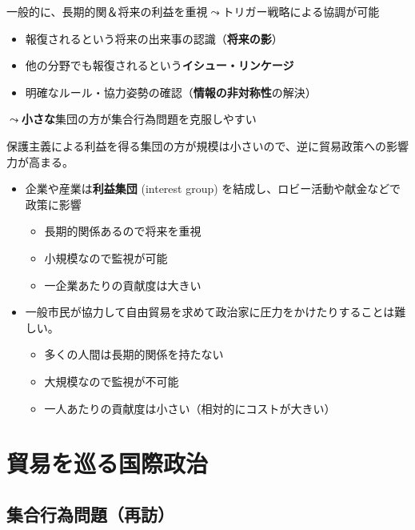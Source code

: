 \documentclass[
  xelatex,
  ja=standard]{bxjsarticle}
\providecommand{\tightlist}{%
  \setlength{\itemsep}{0pt}\setlength{\parskip}{0pt}}\usepackage{longtable,booktabs,array}
\begin{document}
一般的に、長期的関＆将来の利益を重視\(\leadsto\)トリガー戦略による協調が可能

\begin{itemize}
\tightlist
\item
  報復されるという将来の出来事の認識（\textbf{将来の影}）
\item
  他の分野でも報復されるという\textbf{イシュー・リンケージ}
\item
  明確なルール・協力姿勢の確認（\textbf{情報の非対称性}の解決）
\end{itemize}

\(\leadsto\)\textbf{小さな}集団の方が集合行為問題を克服しやすい\citep{olson1996}

保護主義による利益を得る集団の方が規模は小さいので、逆に貿易政策への影響力が高まる。

\begin{itemize}
\tightlist
\item
  企業や産業は\textbf{利益集団} (interest group)
  を結成し、ロビー活動や献金などで政策に影響

  \begin{itemize}
  \tightlist
  \item
    長期的関係あるので将来を重視
  \item
    小規模なので監視が可能
  \item
    一企業あたりの貢献度は大きい
  \end{itemize}
\item
  一般市民が協力して自由貿易を求めて政治家に圧力をかけたりすることは難しい。

  \begin{itemize}
  \tightlist
  \item
    多くの人間は長期的関係を持たない
  \item
    大規模なので監視が不可能
  \item
    一人あたりの貢献度は小さい（相対的にコストが大きい）
  \end{itemize}
\end{itemize}

\hypertarget{ux8cbfux6613ux3092ux5de1ux308bux56fdux969bux653fux6cbb}{%
\section{貿易を巡る国際政治}\label{ux8cbfux6613ux3092ux5de1ux308bux56fdux969bux653fux6cbb}}

\hypertarget{ux96c6ux5408ux884cux70baux554fux984cux518dux8a2a}{%
\subsection{集合行為問題（再訪）}\label{ux96c6ux5408ux884cux70baux554fux984cux518dux8a2a}}
\end{document}
